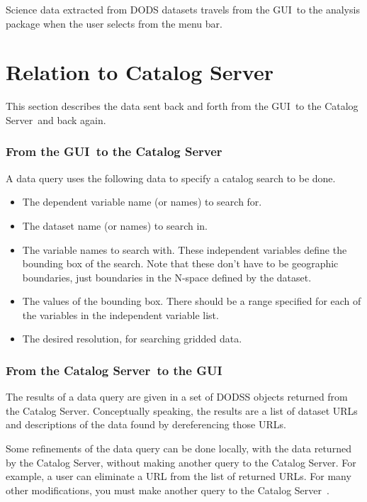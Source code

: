 \documentclass[10pt]{report}
\newcommand{\cs}{Catalog Server}
\newcommand{\gui}{GUI}
\begin{document}
Science data extracted from DODS datasets travels from the \gui\ 
to the analysis package when the user selects  from
the menu bar.


\section{Relation to Catalog Server}
\label{sec:cat-rel}

This section describes the data sent back and forth from the \gui\ to
the \cs\ and back again.


\subsubsection{From the \gui\ to the \cs\ }

A data query uses the following data to specify a catalog search to be
done.

\begin{itemize}
\item The dependent variable name (or names) to search for.
\item The dataset name (or names) to search in.
\item The variable names to search with.  These independent variables
  define the bounding box of the search.  Note that these don't have
  to be geographic boundaries, just boundaries in the N-space defined
  by the dataset.
\item The values of the bounding box.  There should be a range
  specified for each of the variables in the independent variable
  list. 
\item The desired resolution, for searching gridded data.
\end{itemize}

\subsubsection{From the \cs\ to the \gui\ }

The results of a data query are given in a set of DODSS objects
returned from the \cs .  Conceptually speaking, the results are a list
of dataset URLs and descriptions of the data found by dereferencing
those URLs.


Some refinements of the data query can be done locally, with the data
returned by the \cs , without making another query to the \cs .  For
example, a user can eliminate a URL from the list of returned URLs.
For many other modifications, you must make another query to the \cs\ 
.
\end{document}
